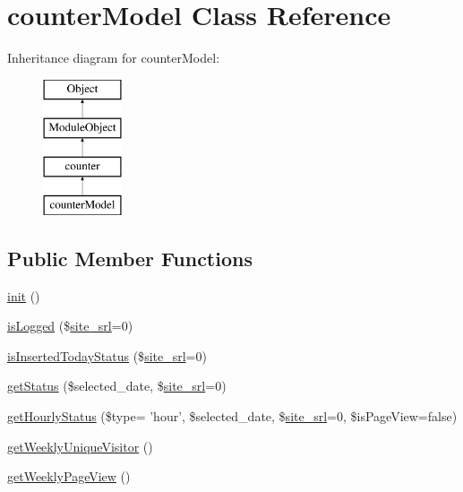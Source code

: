 \hypertarget{classcounterModel}{\section{counter\+Model Class Reference}
\label{classcounterModel}
}
Inheritance diagram for counter\+Model\+:\begin{figure}[H]
\begin{center}
\leavevmode
\includegraphics[height=4.000000cm]{classcounterModel}
\end{center}
\end{figure}
\subsection*{Public Member Functions}
\begin{DoxyCompactItemize}
\item 
\hyperlink{classcounterModel_a3131ee0122d97e0b7d39d6d31a7227dc}{init} ()
\item 
\hyperlink{classcounterModel_a8d9351da08e33d6f47f8645d87ec9380}{is\+Logged} (\$\hyperlink{ko_8install_8php_a8b1406b4ad1048041558dce6bfe89004}{site\+\_\+srl}=0)
\item 
\hyperlink{classcounterModel_ad2e64d22eb37f58e91a37ebb1f421d35}{is\+Inserted\+Today\+Status} (\$\hyperlink{ko_8install_8php_a8b1406b4ad1048041558dce6bfe89004}{site\+\_\+srl}=0)
\item 
\hyperlink{classcounterModel_a83bc31a1c941d3972dba6eae69eab1f6}{get\+Status} (\$selected\+\_\+date, \$\hyperlink{ko_8install_8php_a8b1406b4ad1048041558dce6bfe89004}{site\+\_\+srl}=0)
\item 
\hyperlink{classcounterModel_a165e5f486e0b11e9f61f39ecf0f500eb}{get\+Hourly\+Status} (\$type= 'hour', \$selected\+\_\+date, \$\hyperlink{ko_8install_8php_a8b1406b4ad1048041558dce6bfe89004}{site\+\_\+srl}=0, \$is\+Page\+View=false)
\item 
\hyperlink{classcounterModel_ad43ae0f93cd42e9a59262abfe296fb9a}{get\+Weekly\+Unique\+Visitor} ()
\item 
\hyperlink{classcounterModel_a026465ce135cfff7827d869f1adaeb83}{get\+Weekly\+Page\+View} ()
\end{DoxyCompactItemize}
